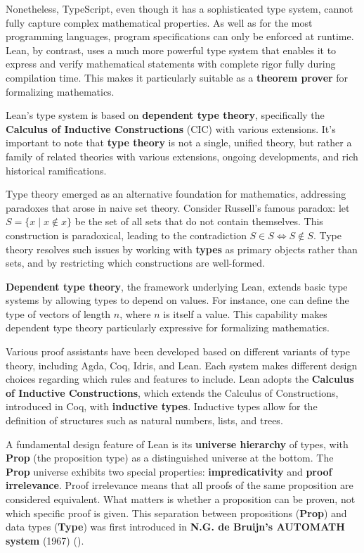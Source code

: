 Nonetheless, TypeScript, even though it has a sophisticated type system, cannot fully 
capture complex mathematical properties. As well as for the most programming languages, 
program specifications can only be enforced at runtime.  
Lean, by contrast, uses a much more powerful type system that enables it to 
express and verify mathematical statements with complete rigor fully during compilation time.  
This makes it particularly suitable as a \textbf{theorem prover} for formalizing mathematics.

Lean's type system is based on \textbf{dependent type theory}, specifically the 
\textbf{Calculus of Inductive Constructions} (CIC) with various extensions. 
It's important to note that \textbf{type theory} is not a single, unified theory, but rather a family of 
related theories with various extensions, ongoing developments, and rich historical ramifications. 

Type theory emerged as an alternative foundation for mathematics, addressing paradoxes 
that arose in naive set theory. Consider Russell's famous paradox: 
let $S = \{x \mid x \notin x\}$ be the set of all sets that do not contain themselves. 
This construction is paradoxical, leading to the contradiction $S \in S \iff S \notin S$. 
Type theory resolves such issues by working with \textbf{types} as primary objects rather than sets, 
and by restricting which constructions are well-formed.

\textbf{Dependent type theory}, the framework underlying Lean, extends basic type systems 
by allowing types to depend on values. For instance, one can define the type of vectors 
of length $n$, where $n$ is itself a value. This capability makes dependent type theory 
particularly expressive for formalizing mathematics.

Various proof assistants have been developed based on different variants of type theory, 
including Agda, Coq, Idris, and Lean. Each system makes different design choices regarding 
which rules and features to include. Lean adopts the \textbf{Calculus of Inductive Constructions}, 
which extends the Calculus of Constructions, introduced in Coq, with \textbf{inductive types}. 
Inductive types allow for the definition of structures 
such as natural numbers, lists, and trees.

A fundamental design feature of Lean is its \textbf{universe hierarchy} of types, with \textbf{Prop} 
(the proposition type) as a distinguished universe at the bottom. 
The \textbf{Prop} universe exhibits two 
special properties: \textbf{impredicativity} and \textbf{proof irrelevance}. 
Proof irrelevance means that all proofs of the same proposition are considered equivalent. What matters 
is whether a proposition can be proven, not which specific proof is given. 
This separation between propositions (\textbf{Prop}) and data types (\textbf{Type}) was first 
introduced in \textbf{N.G. de Bruijn's AUTOMATH system} (1967) 
(\cite{thompson1999types}). 

